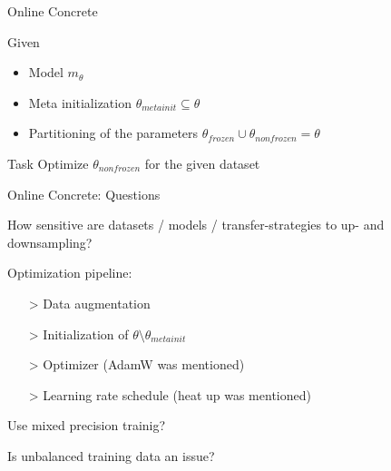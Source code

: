 \documentclass[aspectratio=169,12pt,handout]{beamer}
\begin{document}
\begin{frame}{Online Concrete}



\begin{block}{Given}
    \begin{itemize}
        \item Model $m_\theta$
        \item Meta initialization $\theta_{metainit} \subseteq  \theta$
        \item Partitioning of the parameters $\theta_{frozen} \cup \theta_{nonfrozen} = \theta$
    \end{itemize}
\end{block}

\begin{block}{Task}
Optimize $\theta_{nonfrozen}$ for the given dataset
\end{block}



\end{frame}



\begin{frame}{Online Concrete: Questions}

\begin{itemizebig}
    \item<1->
    How sensitive are datasets / models / transfer-strategies to up- and downsampling?

    \item<2->
    Optimization pipeline:
    \begin{itemize}
        \item[>] Data augmentation
        \item[>] Initialization of $\theta \setminus \theta_{metainit}$
        \item[>] Optimizer (AdamW was mentioned)
        \item[>] Learning rate schedule (heat up was mentioned)
    \end{itemize}

    \item<3->
    Use mixed precision trainig?

    \item<4>
    Is unbalanced training data an issue?

\end{itemizebig}

\end{frame}
\end{document}
